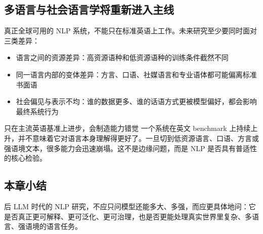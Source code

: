 \subsection{多语言与社会语言学将重新进入主线}

真正全球可用的 NLP 系统，不能只在标准英语上工作。未来研究至少要同时面对三类差异：

\begin{itemize}
    \item 语言之间的资源差异：高资源语种和低资源语种的训练条件截然不同
    \item 同一语言内部的变体差异：方言、口语、社媒语言和专业语体都可能偏离标准书面语
    \item 社会偏见与表示不均：谁的数据更多、谁的话语方式更被模型偏好，都会影响最终系统行为
\end{itemize}

\begin{warningbox}{只在主流英语基准上进步，会制造能力错觉}
一个系统在英文 benchmark 上持续上升，并不意味着它对语言本身理解得更好了。一旦切到低资源语言、口语、方言或强语境文本，很多能力会迅速崩塌。这不是边缘问题，而是 NLP 是否具有普适性的核心检验。
\end{warningbox}

\subsection{本章小结}

后 LLM 时代的 NLP 研究，不应只问模型还能多大、多强，而应更具体地问：它是否真正更可解释、更可泛化、更可治理，也是否更能处理真实世界里复杂、多语言、强语境的语言任务。

